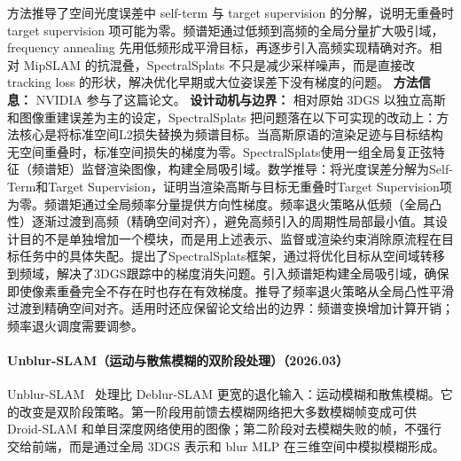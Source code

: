方法推导了空间光度误差中 self-term 与 target supervision 的分解，说明无重叠时 target supervision 项可能为零。频谱矩通过低频到高频的全局分量扩大吸引域，frequency annealing 先用低频形成平滑目标，再逐步引入高频实现精确对齐。相对 MipSLAM 的抗混叠，SpectralSplats 不只是减少采样噪声，而是直接改 tracking loss 的形状，解决优化早期或大位姿误差下没有梯度的问题。
\textbf{方法信息：} NVIDIA 参与了这篇论文。
\textbf{设计动机与边界：} 相对原始 3DGS 以独立高斯和图像重建误差为主的设定，SpectralSplats 把问题落在以下可实现的改动上：方法核心是将标准空间L2损失替换为频谱目标。当高斯原语的渲染足迹与目标结构无空间重叠时，标准空间损失的梯度为零。SpectralSplats使用一组全局复正弦特征（频谱矩）监督渲染图像，构建全局吸引域。数学推导：将光度误差分解为Self-Term和Target Supervision，证明当渲染高斯与目标无重叠时Target Supervision项为零。频谱矩通过全局频率分量提供方向性梯度。频率退火策略从低频（全局凸性）逐渐过渡到高频（精确空间对齐），避免高频引入的周期性局部最小值。其设计目的不是单独增加一个模块，而是用上述表示、监督或渲染约束消除原流程在目标任务中的具体失配。提出了SpectralSplats框架，通过将优化目标从空间域转移到频域，解决了3DGS跟踪中的梯度消失问题。引入频谱矩构建全局吸引域，确保即使像素重叠完全不存在时也存在有效梯度。推导了频率退火策略从全局凸性平滑过渡到精确空间对齐。适用时还应保留论文给出的边界：频谱变换增加计算开销；频率退火调度需要调参。
\paragraph{Unblur-SLAM（运动与散焦模糊的双阶段处理）（2026.03）}
Unblur-SLAM~\cite{2603_26810} 处理比 Deblur-SLAM 更宽的退化输入：运动模糊和散焦模糊。它的改变是双阶段策略。第一阶段用前馈去模糊网络把大多数模糊帧变成可供 Droid-SLAM 和单目深度网络使用的图像；第二阶段对去模糊失败的帧，不强行交给前端，而是通过全局 3DGS 表示和 blur MLP 在三维空间中模拟模糊形成。

